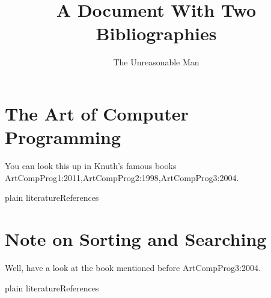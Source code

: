 \documentclass{article}
\title{A Document With Two Bibliographies}
\author{The Unreasonable Man}
\begin{document}
 
   \section{The Art of Computer Programming}
   You can look this up in Knuth's famous books
   \cite{main}{ArtCompProg1:2011,ArtCompProg2:1998,ArtCompProg3:2004}.
 
   {plain}
   {literature}{References}
 
   \appendix
   \section{Note on Sorting and Searching}
   Well, have a look at the book mentioned before \cite{appendix}{ArtCompProg3:2004}.
 
   {plain}
   {literature}{References}
 
\end{document}
